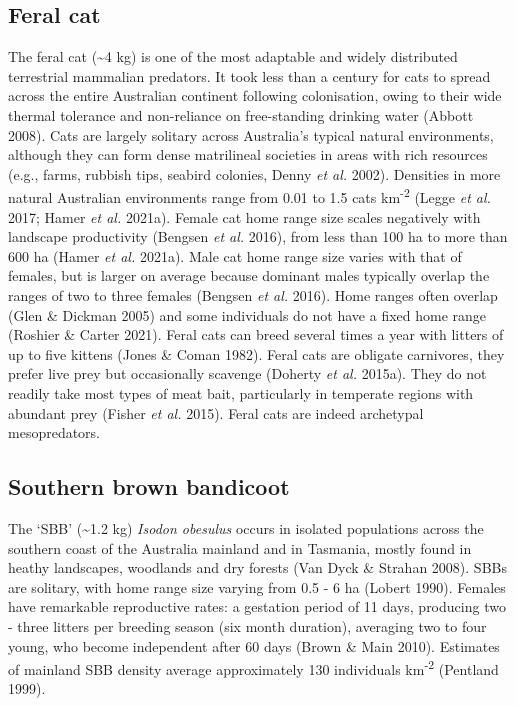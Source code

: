 \documentclass[11pt,a4paper,titlepage,twoside,openright]{style/unimelbthesis}
\begin{document}
\begin{mainmatter}
\hypertarget{feral-cat}{%
\subsection{Feral cat}\label{feral-cat}}

The feral cat (\textasciitilde4 kg) is one of the most adaptable and widely distributed terrestrial mammalian predators. It took less than a century for cats to spread across the entire Australian continent following colonisation, owing to their wide thermal tolerance and non-reliance on free-standing drinking water (Abbott 2008). Cats are largely solitary across Australia's typical natural environments, although they can form dense matrilineal societies in areas with rich resources (e.g., farms, rubbish tips, seabird colonies, Denny \emph{et al.} 2002). Densities in more natural Australian environments range from 0.01 to 1.5 cats km\textsuperscript{-2} (Legge \emph{et al.} 2017; Hamer \emph{et al.} 2021a). Female cat home range size scales negatively with landscape productivity (Bengsen \emph{et al.} 2016), from less than 100 ha to more than 600 ha (Hamer \emph{et al.} 2021a). Male cat home range size varies with that of females, but is larger on average because dominant males typically overlap the ranges of two to three females (Bengsen \emph{et al.} 2016). Home ranges often overlap (Glen \& Dickman 2005) and some individuals do not have a fixed home range (Roshier \& Carter 2021). Feral cats can breed several times a year with litters of up to five kittens (Jones \& Coman 1982). Feral cats are obligate carnivores, they prefer live prey but occasionally scavenge (Doherty \emph{et al.} 2015a). They do not readily take most types of meat bait, particularly in temperate regions with abundant prey (Fisher \emph{et al.} 2015). Feral cats are indeed archetypal mesopredators.

\hypertarget{southern-brown-bandicoot}{%
\subsection{Southern brown bandicoot}\label{southern-brown-bandicoot}}

The `SBB' (\textasciitilde1.2 kg) \emph{Isodon obesulus} occurs in isolated populations across the southern coast of the Australia mainland and in Tasmania, mostly found in heathy landscapes, woodlands and dry forests (Van Dyck \& Strahan 2008). SBBs are solitary, with home range size varying from 0.5 - 6 ha (Lobert 1990). Females have remarkable reproductive rates: a gestation period of 11 days, producing two - three litters per breeding season (six month duration), averaging two to four young, who become independent after 60 days (Brown \& Main 2010). Estimates of mainland SBB density average approximately 130 individuals km\textsuperscript{-2} (Pentland 1999).


\end{mainmatter}
\end{document}
